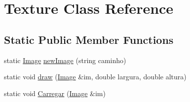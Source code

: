 \hypertarget{class_texture}{\section{\-Texture \-Class \-Reference}
\label{class_texture}
}
\subsection*{\-Static \-Public \-Member \-Functions}
\begin{DoxyCompactItemize}
\item 
static \hyperlink{class_image}{\-Image} \hyperlink{class_texture_a823a87ab61d73d96d7b3626650cbf3f7}{new\-Image} (string caminho)
\item 
static void \hyperlink{class_texture_a0d4183fbf8af80a0365358a1ac7d887b}{draw} (\hyperlink{class_image}{\-Image} \&im, double largura, double altura)
\item 
static void \hyperlink{class_texture_a39190edf6a49c9b717847b60f30480f8}{\-Carregar} (\hyperlink{class_image}{\-Image} \&im)
\end{DoxyCompactItemize}



